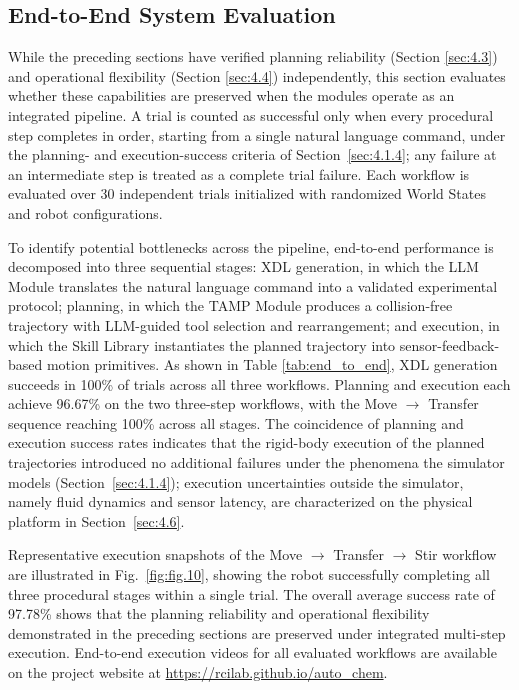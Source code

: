 \documentclass{ieeeaccess}
\newif\ifhighlight
\newcommand{\rev}[1]{\ifhighlight\hl{#1}\else#1\fi}
\begin{document}
\subsection{End-to-End System Evaluation}\label{sec:4.5}
While the preceding sections have verified planning reliability (Section \ref{sec:4.3}) and operational flexibility (Section \ref{sec:4.4}) independently, this section evaluates whether these capabilities are preserved when the modules operate as an integrated pipeline. A trial is counted as successful only when every procedural step completes in order, starting from a single natural language command\rev{, under the planning- and execution-success criteria of Section~\ref{sec:4.1.4}}; any failure at an intermediate step is treated as a complete trial failure. Each workflow is evaluated over 30 independent trials initialized with randomized World States and robot configurations.

To identify potential bottlenecks across the pipeline, end-to-end performance is decomposed into three sequential stages: XDL generation, in which the LLM Module translates the natural language command into a validated experimental protocol; planning, in which the TAMP Module produces a collision-free trajectory with LLM-guided tool selection and rearrangement; and execution, in which the Skill Library instantiates the planned trajectory into sensor-feedback-based motion primitives. As shown in Table \ref{tab:end_to_end}, XDL generation succeeds in 100\% of trials across all three workflows. Planning and execution each achieve 96.67\% on the two three-step workflows, with the Move $\rightarrow$ Transfer sequence reaching 100\% across all stages. \rev{The coincidence of planning and execution success rates indicates that the rigid-body execution of the planned trajectories introduced no additional failures under the phenomena the simulator models (Section~\ref{sec:4.1.4}); execution uncertainties outside the simulator, namely fluid dynamics and sensor latency, are characterized on the physical platform in Section~\ref{sec:4.6}.}




Representative execution snapshots of the Move $\rightarrow$ Transfer $\rightarrow$ Stir workflow are illustrated in Fig.~\ref{fig:fig.10}, showing the robot successfully completing all three procedural stages within a single trial. The overall average success rate of 97.78\% shows that the planning reliability and operational flexibility demonstrated in the preceding sections are preserved under integrated multi-step execution. End-to-end execution videos for all evaluated workflows are available on the project website at \url{https://rcilab.github.io/auto_chem}.
\end{document}
